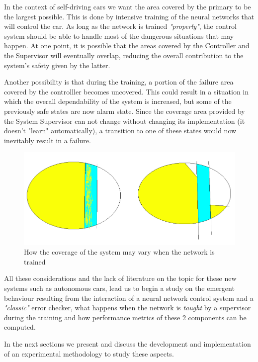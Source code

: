 In the context of self-driving cars we want the area covered by the primary to be the largest possible. This is done by intensive training of the neural networks that will control the car. As long as the network is trained \textsl{"properly"}, the control system should be able to handle most of the dangerous situations that may happen. At one point, it is possible that the areas covered by the Controller and the Supervisor will eventually overlap, reducing the overall contribution to the system's safety given by the latter.

Another possibility is that during the training, a portion of the failure area covered by the controlller becomes uncovered. This could result in a situation in which the overall dependability of the system is increased, but some of the previously safe states are now alarm state. Since the coverage area provided by the System Supervisor can not change without changing its implementation (it doesn't "learn" automatically), a transition to one of these states would now inevitably result in a failure.

\begin{figure}[h!]
	\includegraphics[width=\textwidth]{img/area-growth.png}
	\caption{How the coverage of the system may vary when the network is trained}
\end{figure}

All these considerations and the lack of literature on the topic for these new systems such as autonomous cars, lead us to begin a study on the emergent behaviour resulting from the interaction of a neural network control system and a \textsl{"classic"} error checker, what happens when the network is \textsl{taught} by a supervisor during the training and how performance metrics of these 2 components can be computed.\newline

In the next sections we present and discuss the development and implementation of an experimental methodology to study these aspects.
